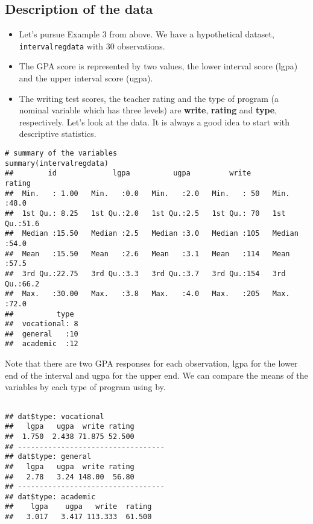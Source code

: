 \documentclass[a4paper,12pt]{article}
\begin{document}
\subsection*{Description of the data}
\begin{itemize}
	\item Let's pursue Example 3 from above. We have a hypothetical dataset, \texttt{intervalregdata} with 30 observations.
	
	\item The GPA score is represented by two values, the lower interval score (lgpa) and the upper interval score (ugpa). 
	
	\item The writing test scores, the teacher rating and the type of program (a nominal variable which has three levels) are \textbf{write}, \textbf{rating} and \textbf{type}, respectively. Let's look at the data. It is always a good idea to start with descriptive statistics.
\end{itemize}


{
\begin{framed}
	\normalsize
\begin{verbatim}
# summary of the variables
summary(intervalregdata)
##        id             lgpa          ugpa         write         rating    
##  Min.   : 1.00   Min.   :0.0   Min.   :2.0   Min.   : 50   Min.   :48.0  
##  1st Qu.: 8.25   1st Qu.:2.0   1st Qu.:2.5   1st Qu.: 70   1st Qu.:51.6  
##  Median :15.50   Median :2.5   Median :3.0   Median :105   Median :54.0  
##  Mean   :15.50   Mean   :2.6   Mean   :3.1   Mean   :114   Mean   :57.5  
##  3rd Qu.:22.75   3rd Qu.:3.3   3rd Qu.:3.7   3rd Qu.:154   3rd Qu.:66.2  
##  Max.   :30.00   Max.   :3.8   Max.   :4.0   Max.   :205   Max.   :72.0  
##          type   
##  vocational: 8  
##  general   :10  
##  academic  :12  
\end{verbatim}
\end{framed}
} 
Note that there are two GPA responses for each observation, lgpa for the lower end of the interval and ugpa for the upper end. We can compare the means of the variables by each type of program using by.
\begin{framed}
\begin{verbatim}

## dat$type: vocational
##   lgpa   ugpa  write rating 
##  1.750  2.438 71.875 52.500 
## ----------------------------------
## dat$type: general
##   lgpa   ugpa  write rating 
##   2.78   3.24 148.00  56.80 
## ----------------------------------
## dat$type: academic
##    lgpa    ugpa   write  rating 
##   3.017   3.417 113.333  61.500

\end{verbatim}
\end{framed}
\end{document}
